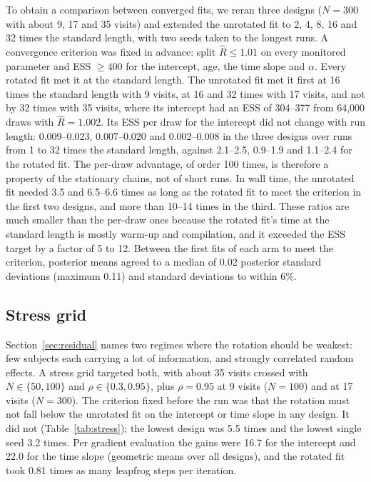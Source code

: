 To obtain a comparison between converged fits, we reran three designs
($N = 300$ with about 9, 17 and 35 visits) and extended the unrotated fit
to 2, 4, 8, 16 and 32 times the standard length, with two seeds taken to
the longest runs. A convergence criterion was fixed in advance: split $\hat
R \leq 1.01$ on every monitored parameter and ESS $\geq 400$ for the
intercept, age, the time slope and $\alpha$. Every rotated fit met it at
the standard length. The unrotated fit met it first at 16 times the
standard length with 9 visits, at 16 and 32 times with 17 visits, and not
by 32 times with 35 visits, where its intercept had an ESS of 304--377 from
64,000 draws with $\hat R = 1.002$. Its ESS per draw for the intercept did
not change with run length: 0.009--0.023, 0.007--0.020 and 0.002--0.008 in
the three designs over runs from 1 to 32 times the standard length, against
2.1--2.5, 0.9--1.9 and 1.1--2.4 for the rotated fit. The per-draw advantage,
of order 100 times, is therefore a property of the stationary chains, not
of short runs. In wall time, the unrotated fit needed 3.5 and 6.5--6.6
times as long as the rotated fit to meet the criterion in the first two
designs, and more than 10--14 times in the third. These ratios are much
smaller than the per-draw ones because the rotated fit's time at the
standard length is mostly warm-up and compilation, and it exceeded the ESS
target by a factor of 5 to 12. Between the first fits of each arm to meet
the criterion, posterior means agreed to a median of 0.02 posterior
standard deviations (maximum 0.11) and standard deviations to within 6\%.

\subsection{Stress grid}\label{sec:stress}

Section~\ref{sec:residual} names two regimes where the rotation should be
weakest: few subjects each carrying a lot of information, and strongly
correlated random effects. A stress grid targeted both, with about 35
visits crossed with $N \in \{50, 100\}$ and $\rho \in \{0.3, 0.95\}$, plus
$\rho = 0.95$ at 9 visits ($N = 100$) and at 17 visits ($N = 300$). The
criterion fixed before the run was that the rotation must not fall below
the unrotated fit on the intercept or time slope in any design. It did not
(Table~\ref{tab:stress}); the lowest design was 5.5 times and the lowest
single seed 3.2 times. Per gradient evaluation the gains were 16.7 for the
intercept and 22.0 for the time slope (geometric means over all designs),
and the rotated fit took 0.81 times as many leapfrog steps per iteration.

